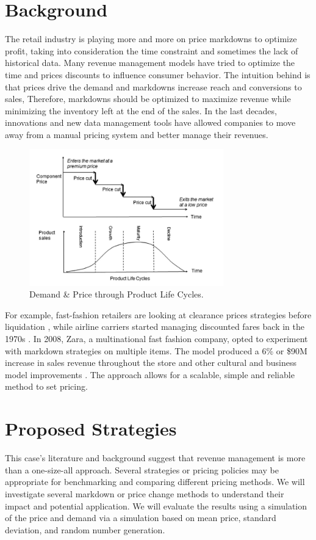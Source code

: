 \documentclass[11pt,a4paper]{article}
\begin{document}
\section{Background}
The retail industry is playing more and more on price markdowns to optimize profit, taking into consideration the time constraint and sometimes the lack of historical data. 
Many revenue management models have tried to optimize the time and prices discounts to influence consumer behavior. 
The intuition behind is that prices drive the demand and markdowns increase reach and conversions to sales, 
Therefore, markdowns should be optimized to maximize revenue while minimizing the inventory left at the end of the sales. 
In the last decades, innovations and new data management tools have allowed companies to move away from a manual pricing system and better manage their revenues. 
\pagebreak
\begin{figure}
    \centering
    \includegraphics[width=0.75\textwidth]{pic/Picture1.png}
    \caption{Demand \& Price through Product Life Cycles.\\\cite{chung2015optimal}}
\end{figure}
\hfill \break

For example, fast-fashion retailers are looking at clearance prices strategies before liquidation \cite{caro2012clearance}, while airline carriers started managing discounted fares back in the 1970s \cite{talluri2004revenue}. 
In 2008, Zara, a multinational fast fashion company, opted to experiment with markdown strategies on multiple items. 
The model produced a 6\% or \$90M increase in sales revenue throughout the store and other cultural and business model improvements \cite{caro2012clearance}. 
The approach allows for a scalable, simple and reliable method to set pricing. 

\section{Proposed Strategies}
This case’s literature and background suggest that revenue management is more than a one-size-all approach. 
Several strategies or pricing policies may be appropriate for benchmarking and comparing different pricing methods. 
We will investigate several markdown or price change methods to understand their impact and potential application. 
We will evaluate the results using a simulation of the price and demand via a simulation based on mean price, standard deviation, and random number generation.
\end{document}

